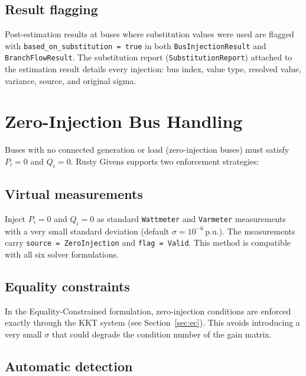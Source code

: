 \documentclass[11pt,a4paper]{article}
\begin{document}
\subsection{Result flagging}

Post-estimation results at buses where substitution values were used are
flagged with \texttt{based\_on\_substitution = true} in both
\texttt{BusInjectionResult} and \texttt{BranchFlowResult}.  The
substitution report (\texttt{SubstitutionReport}) attached to the
estimation result details every injection: bus index, value type, resolved
value, variance, source, and original sigma.



\section{Zero-Injection Bus Handling}\label{sec:zi}

Buses with no connected generation or load (zero-injection buses) must
satisfy $P_i = 0$ and $Q_i = 0$.  Rusty Givens supports two enforcement
strategies:

\subsection{Virtual measurements}

Inject $P_i = 0$ and $Q_i = 0$ as standard \texttt{Wattmeter} and
\texttt{Varmeter} measurements with a very small standard deviation
(default $\sigma = 10^{-6}$\,p.u.).  The measurements carry
\texttt{source = ZeroInjection} and \texttt{flag = Valid}.  This method
is compatible with all six solver formulations.

\subsection{Equality constraints}

In the Equality-Constrained formulation, zero-injection conditions are
enforced exactly through the \gls{KKT} system (see
Section~\ref{sec:ec}).  This avoids introducing a very small $\sigma$ that
could degrade the condition number of the gain matrix.

\subsection{Automatic detection}
\end{document}
